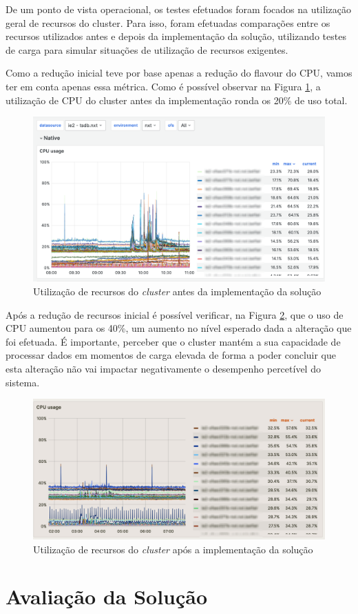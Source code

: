 De um ponto de vista operacional, os testes efetuados foram focados na utilização geral de
recursos do \gls{cluster}. Para isso, foram efetuadas comparações entre os recursos utilizados
antes e depois da implementação da solução, utilizando testes de carga para simular situações
de utilização de recursos exigentes.

Como a redução inicial teve por base apenas a redução do \gls{flavour} do \ac{CPU}, vamos ter em conta
apenas essa métrica. Como é possível observar na Figura \ref{usage-before}, a utilização de \ac{CPU}
do \gls{cluster} antes da implementação ronda os 20\% de uso total.

\begin{figure}[H]
  \centerline{\includegraphics[scale=0.25]{media/content/impl/grafana-before-1.png}}
  \caption{Utilização de recursos do \textit{cluster} antes da implementação da solução}
  \label{usage-before}
\end{figure}

Após a redução de recursos inicial é possível verificar, na Figura \ref{usage-after}, que o uso 
de CPU aumentou para os 40\%, um aumento no nível esperado dada a alteração que foi efetuada. É 
importante, perceber que o \gls{cluster} mantém a sua capacidade de processar dados em momentos de 
carga elevada de forma a poder concluir que esta alteração não vai impactar negativamente o 
desempenho percetível do sistema. 

\begin{figure}[H]
  \centerline{\includegraphics[scale=0.5]{media/content/impl/grafana-after.png}}
  \caption{Utilização de recursos do \textit{cluster} após a implementação da solução}
  \label{usage-after}
\end{figure}

\section{Avaliação da Solução}


